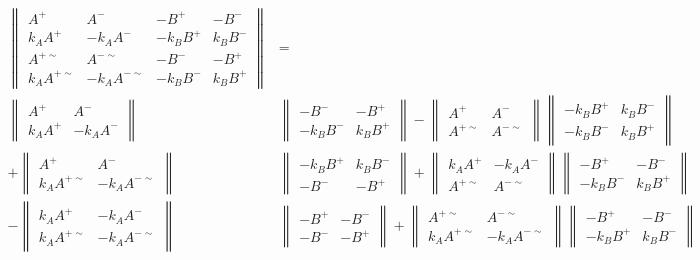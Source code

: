 \documentclass[autodetect-engine,dvipdfmx-if-dvi,ja=standard,a4paper,layout=v2]{bxjsreport}
\begin{document}
    \begin{align}
    \begin{Vmatrix}
    A^+&A^-&-B^+&-B^-\\
    k_AA^+&-k_AA^-&-k_BB^+&k_BB^-\\
    A^{+\sim}&A^{-\sim}&-B^-&-B^+\\
    k_AA^{+\sim}&-k_AA^{-\sim}&-k_BB^-&k_BB^+
    \end{Vmatrix}&=\nonumber\\
    \begin{Vmatrix}
    A^+&A^-\\
    k_AA^+&-k_AA^-
    \end{Vmatrix}&
    \begin{Vmatrix}
    -B^-&-B^+\\
    -k_BB^-&k_BB^+
    \end{Vmatrix}-
    \begin{Vmatrix}
    A^+&A^-\\
    A^{+\sim}&A^{-\sim}
    \end{Vmatrix}
    \begin{Vmatrix}
    -k_BB^+&k_BB^-\\
    -k_BB^-&k_BB^+
    \end{Vmatrix}\nonumber\\+
    \begin{Vmatrix}
    A^+&A^-\\
    k_AA^{+\sim}&-k_AA^{-\sim}
    \end{Vmatrix}&
    \begin{Vmatrix}
    -k_BB^+&k_BB^-\\
    -B^-&-B^+
    \end{Vmatrix}+
    \begin{Vmatrix}
    k_AA^+&-k_AA^-\\
    A^{+\sim}&A^{-\sim}
    \end{Vmatrix}
    \begin{Vmatrix}
    -B^+&-B^-\\
    -k_BB^-&k_BB^+
    \end{Vmatrix}\nonumber\\-
    \begin{Vmatrix}
    k_AA^+&-k_AA^-\\
    k_AA^{+\sim}&-k_AA^{-\sim}
    \end{Vmatrix}&
    \begin{Vmatrix}
    -B^+&-B^-\\
    -B^-&-B^+
    \end{Vmatrix}+
    \begin{Vmatrix}
    A^{+\sim}&A^{-\sim}\\
    k_AA^{+\sim}&-k_AA^{-\sim}
    \end{Vmatrix}
    \begin{Vmatrix}
    -B^+&-B^-\\
    -k_BB^+&k_BB^-
    \end{Vmatrix}
    \end{align}
\end{document}
